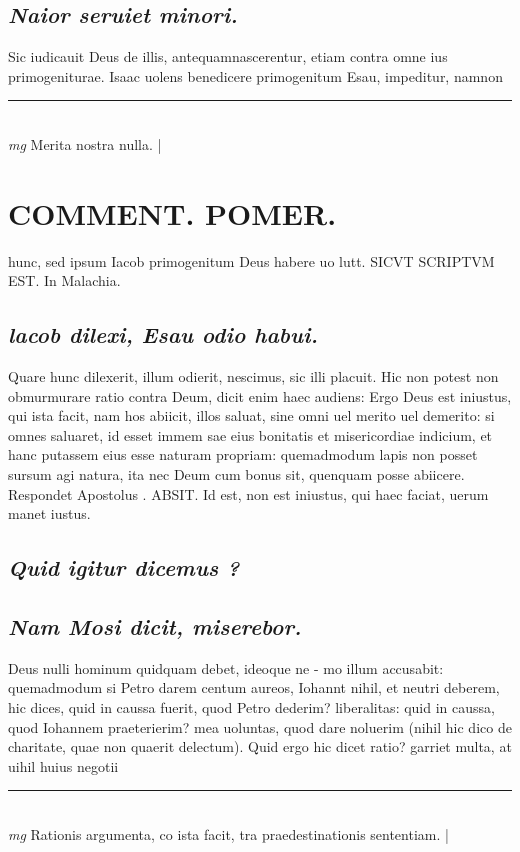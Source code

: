 \documentclass{article}
\begin{document}
\begin{pages}
\subsection*{\textit{Naior seruiet minori. }}\pstart Sic iudicauit Deus de illis, antequamnascerentur, etiam contra omne ius primogeniturae. Isaac uolens benedicere primogenitum Esau, impeditur, namnon  \pend
\vspace{0.5cm}\noindent
\vspace{0.2cm}\rule{1cm}{0.2pt}\\ 
\hspace{0.2cm}\textit{mg}
\footnotesize Merita nostra nulla.  
\normalsize| 
\section*{COMMENT. POMER.  }\pstart hunc, sed ipsum Iacob primogenitum Deus habere uo lutt. SICVT SCRIPTVM EST. In Malachia.  \pend
{}
{}
\subsection*{\textit{lacob dilexi, Esau odio habui. }}\pstart Quare hunc dilexerit, illum odierit, nescimus, sic illi placuit.   \pend\pstart Hic non potest non obmurmurare ratio contra Deum, dicit enim haec audiens: Ergo Deus est iniustus, qui ista facit, nam hos abiicit, illos saluat, sine omni uel merito uel demerito: si omnes saluaret, id esset immem sae eius bonitatis et misericordiae indicium, et hanc putassem eius esse naturam propriam: quemadmodum lapis non posset sursum agi natura, ita nec Deum cum bonus sit, quenquam posse abiicere. Respondet Apostolus . ABSIT. Id est, non est iniustus, qui haec faciat, uerum manet iustus.   \pend
{}
{}
\subsection*{\textit{Quid igitur dicemus ? }}
{}
\subsection*{\textit{Nam Mosi dicit, miserebor. }}\pstart Deus nulli hominum quidquam debet, ideoque ne - mo illum accusabit: quemadmodum si Petro darem centum aureos, Iohannt nihil, et neutri deberem, hic dices, quid in caussa fuerit, quod Petro dederim? liberalitas: quid in caussa, quod Iohannem praeterierim? mea uoluntas, quod dare noluerim (nihil hic dico de charitate, quae non quaerit delectum). Quid ergo hic dicet ratio? garriet multa, at uihil huius negotii  \pend
\vspace{0.5cm}\noindent
\vspace{0.2cm}\rule{1cm}{0.2pt}\\ 
\hspace{0.2cm}\textit{mg}
\footnotesize Rationis argumenta, co ista facit, tra praedestinationis sententiam.  
\normalsize| 

\end{pages}
\end{document}
